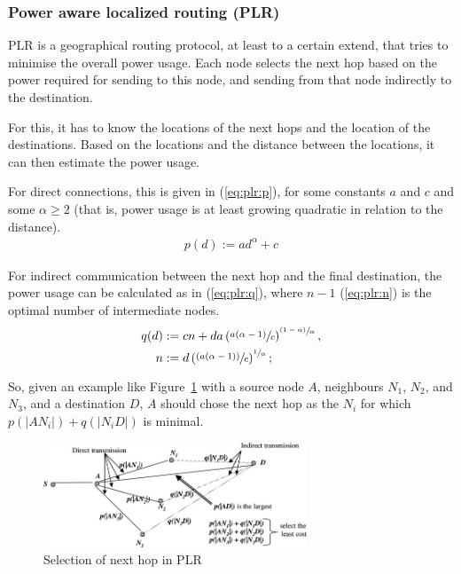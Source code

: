 \subsubsection{Power aware localized routing (PLR)}
PLR\cite{stojmenovic2001power} is a geographical routing protocol, at least
to a certain extend, that tries to minimise the overall power usage. Each node
selects the next hop based on the power required for sending to this node, and
sending from that node indirectly to the destination.

For this, it has to know the locations of the next hops and the location of
the destinations. Based on the locations and the distance between the locations,
it can then estimate the power usage.

For direct connections, this is given in (\ref{eq:plr:p}),
for some constants $a$ and $c$ and some $\alpha \ge 2$ (that is, power usage
is at least growing quadratic in relation to the distance).
\begin{align}\label{eq:plr:p} p(d) := ad^{\alpha} + c \end{align}

For indirect communication between the next hop and the final destination,
the power usage can be calculated as in (\ref{eq:plr:q}), where $n-1$ (\ref{eq:plr:n}) is the optimal number of intermediate nodes\cite{stojmenovic2001power}.
\begin{align}
  \label{eq:plr:q}
   q(d) &:= cn + da \left(\sfrac{a(\alpha - 1)}{c}\right)^{\sfrac{(1-\alpha)}{\alpha}}, \\
   \label{eq:plr:n}
      n &:= d\left(\sfrac{(a(\alpha - 1))}{c}\right)^{\sfrac{1}{\alpha}};
\end{align}

So, given an example like Figure~\ref{plrexample} with a source node $A$, neighbours $N_{1}$, $N_{2}$, and $N_{3}$, and a
destination $D$, $A$ should chose the next hop as the $N_{i}$ for which
$p(|AN_{i}|) + q(|N_{i}D|)$ is minimal.

\begin{figure}
\centering
\includegraphics[width=0.7\textwidth]{images/plr-example}
\caption{Selection of next hop in PLR\cite{alotaibi2012survey}}
\label{plrexample}
\end{figure}

